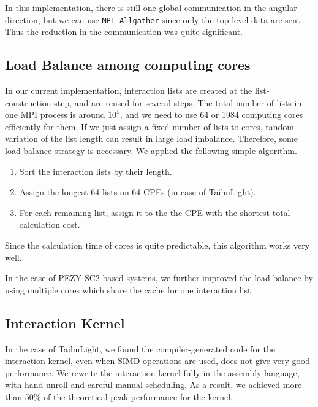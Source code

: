 \documentclass[conference]{IEEEtran}
\begin{document}
In this implementation, there is still one global communication in the
angular direction, but we can use {\tt MPI\_Allgather} since only the
top-level data are sent. Thus the reduction in the communication was
quite significant.


\subsection{Load Balance among computing cores}
\label{subsec:force}

In our current implementation, interaction lists are created at the
list-construction step, and are reused for several steps. The total
number of lists in one MPI process is around $10^5$, and we need to
use 64 or 1984 computing cores efficiently for them.
If we just assign a fixed number of lists to cores, random variation
of the list length can result in large load imbalance. Therefore, some
load balance strategy is necessary. We applied the following simple algorithm.

\begin{enumerate}
  
\item Sort the interaction lists by their length.

\item Assign the longest 64 lists on 64 CPEs (in case of TaihuLight).

\item For each remaining list, assign it to the the CPE with the
  shortest total calculation cost.
  
\end{enumerate}

Since the calculation time of cores is quite predictable, this
algorithm works very well.

In the case of PEZY-SC2 based systems, we further improved the load
balance by using multiple cores which share the cache for one
interaction list.

\subsection{Interaction Kernel}

In the case of TaihuLight, we found the compiler-generated code for
the interaction kernel, even when SIMD operations are used, does not
give very good performance. We rewrite the interaction kernel fully in
the assembly language, with hand-unroll and careful manual scheduling. As
a result, we achieved more than 50\% of the theoretical peak
performance for the kernel.
\end{document}
